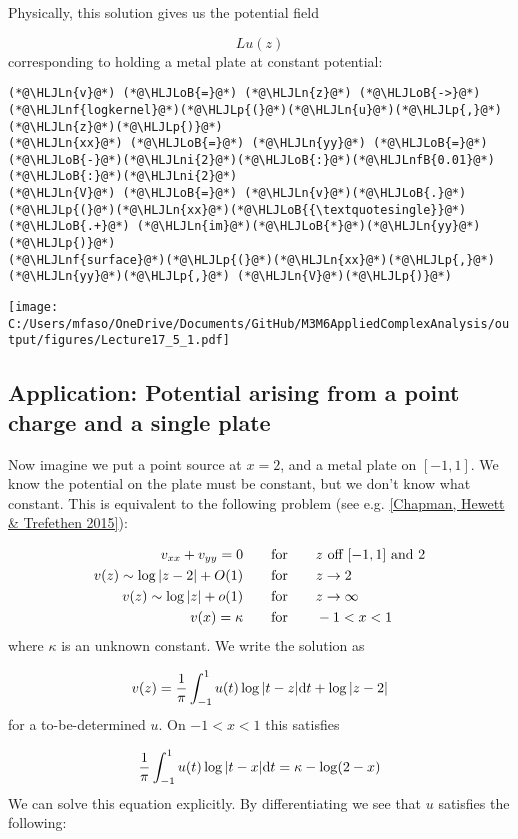 \documentclass[12pt,landscape]{article}
\newcommand{\HLJLn}[1]{#1}
\newcommand{\HLJLnf}[1]{\textcolor[RGB]{66,102,213}{#1}}
\newcommand{\HLJLnfB}[1]{\textcolor[RGB]{59,151,46}{#1}}
\newcommand{\HLJLni}[1]{\textcolor[RGB]{59,151,46}{#1}}
\newcommand{\HLJLoB}[1]{\textcolor[RGB]{102,102,102}{\textbf{#1}}}
\newcommand{\HLJLp}[1]{#1}
\def\qqfor{\qquad\hbox{for}\qquad}
\def\D{ {\rm d} }
\def\dt{\D t}
\def\cent#1{\begin{center}#1\end{center} }
\begin{document}
{Physically, this solution gives us the potential field

\[
L u(z)
\]
corresponding to holding a metal plate at constant potential:


\begin{lstlisting}
(*@\HLJLn{v}@*) (*@\HLJLoB{=}@*) (*@\HLJLn{z}@*) (*@\HLJLoB{->}@*) (*@\HLJLnf{logkernel}@*)(*@\HLJLp{(}@*)(*@\HLJLn{u}@*)(*@\HLJLp{,}@*) (*@\HLJLn{z}@*)(*@\HLJLp{)}@*)
(*@\HLJLn{xx}@*) (*@\HLJLoB{=}@*) (*@\HLJLn{yy}@*) (*@\HLJLoB{=}@*) (*@\HLJLoB{-}@*)(*@\HLJLni{2}@*)(*@\HLJLoB{:}@*)(*@\HLJLnfB{0.01}@*)(*@\HLJLoB{:}@*)(*@\HLJLni{2}@*)
(*@\HLJLn{V}@*) (*@\HLJLoB{=}@*) (*@\HLJLn{v}@*)(*@\HLJLoB{.}@*)(*@\HLJLp{(}@*)(*@\HLJLn{xx}@*)(*@\HLJLoB{{\textquotesingle}}@*) (*@\HLJLoB{.+}@*) (*@\HLJLn{im}@*)(*@\HLJLoB{*}@*)(*@\HLJLn{yy}@*)(*@\HLJLp{)}@*)
(*@\HLJLnf{surface}@*)(*@\HLJLp{(}@*)(*@\HLJLn{xx}@*)(*@\HLJLp{,}@*) (*@\HLJLn{yy}@*)(*@\HLJLp{,}@*) (*@\HLJLn{V}@*)(*@\HLJLp{)}@*)
\end{lstlisting}
\cent{\texttt{[image: C:/Users/mfaso/OneDrive/Documents/GitHub/M3M6AppliedComplexAnalysis/output/figures/Lecture17\_5\_1.pdf]}}

\subsection{Application: Potential arising from a point charge and a single plate}
Now imagine we put a point source at $x = 2$, and a metal plate on $[-1,1]$. We know the potential on the plate must be constant, but we don't know what constant. This is equivalent to the following problem (see e.g. \href{https://people.maths.ox.ac.uk/trefethen/chapman_hewett_trefethen.pdf}{[Chapman, Hewett \& Trefethen 2015]}):


\begin{align*}
v_{xx} + v_{yy} = 0 &\qqfor \hbox{$z$ off $[-1,1]$ and $2$}  \\
v(z) \sim \log |z - 2| + O(1) &\qqfor z \rightarrow 2 \\
v(z) \sim \log|z| + o(1) &\qqfor z \rightarrow \infty \\
v(x) = \kappa &\qqfor -1 < x < 1
\end{align*}
where $\kappa$ is an unknown constant.  We write the solution as

\[
v(z) = {1 \over \pi} \int_{-1}^1 u(t) \log|t-z| \dt + \log|z-2|
\]
for a to-be-determined $u$. On $-1 < x < 1$ this satisfies

\[
 {1 \over \pi} \int_{-1}^1 u(t) \log|t-x| \dt  = \kappa - \log(2-x)
\]
We can solve this equation explicitly. By differentiating we see that $u$ satisfies the following:

}
\end{document}

